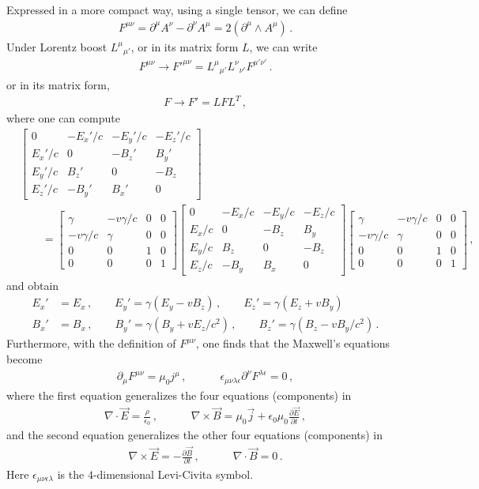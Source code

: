 \documentclass[11pt, onesided]{book}
\theoremstyle{break}
\theoremstyle{break}
\newcommand{\pd}{\partial}
\newcommand{\bmat}[1]{\begin{bmatrix} #1 \end{bmatrix}}
\begin{document}
Expressed in a more compact way, using a single tensor, we can define
\begin{align*}
F^{\mu\nu} = \pd^\mu A^\nu - \pd^\nu A^\mu = 2(\pd^\mu \wedge A^\mu)\,.
\end{align*}
Under Lorentz boost $L^\mu{}_{\mu'}$, or in its matrix form $L$, we can write
\begin{align*}
F^{\mu\nu}\to F'^{\mu\nu} = L^\mu{}_{\mu'}L^\nu{}_{\nu'}F^{\mu'\nu'}\,.
\end{align*}
or in its matrix form, 
\begin{align*}
F \to F' = LFL^T\,,
\end{align*}
where one can compute
\begin{align*}
&\bmat{0 & -E_x'/c & -E_y'/c & -E_z'/c \\
E_x'/c & 0 & -B_z' & B_y'\\
E_y'/c & B_z' & 0 & -B_z\\
E_z'/c & -B_y' & B_x' & 0}
 \\
 &{}\qquad = \bmat{\gamma & -v\gamma/c & 0 & 0\\
 -v\gamma/c & \gamma & 0 & 0\\
 0 & 0 & 1 & 0\\
 0 & 0 & 0 & 1}
 \bmat{0 & -E_x/c & -E_y /c & -E_z /c \\
E_x/c & 0 & -B_z & B_y\\
E_y/c & B_z & 0 & -B_z\\
E_z/c & -B_y & B_x & 0}
\bmat{\gamma & -v\gamma/c & 0 & 0\\
 -v\gamma/c & \gamma & 0 & 0\\
 0 & 0 & 1 & 0\\
 0 & 0 & 0 & 1}\,,
\end{align*}
and obtain
\begin{align*}
E_x' &= E_x\,,\qquad
E_y' = \gamma(E_y  -vB_z)\,,\qquad
E_z' = \gamma(E_z + vB_y)\\
B_x' &= B_x\,,\qquad
B_y' = \gamma(B_y+ vE_z/c^2)\,,\qquad
B_z' = \gamma(B_z-vB_y/c^2)\,.
\end{align*}
Furthermore, with the definition of $F^{\mu\nu}$, one finds that the Maxwell's equations become
\begin{align*}
\pd_\mu F^{\mu\nu} = \mu_0 j^\mu\,,\qquad\quad
\epsilon_{\mu\nu \lambda\epsilon}\pd^\nu F^{\lambda \epsilon} = 0\,,
\end{align*}
where the first equation generalizes the four equations (components) in 
\begin{align*}
\nabla \cdot \vec{E} = \frac{\rho }{\epsilon_0}\,,\qquad\quad
\nabla \times \vec{B} = \mu_0 \vec{j} + \epsilon_0 \mu_0 \frac{\pd \vec{E}}{\pd t}\,,
\end{align*}
and the second equation generalizes the other four equations (components) in
\begin{align*}
\nabla \times \vec{E} = -\frac{\pd \vec{B}}{\pd t}\,,\qquad\quad
\nabla \cdot \vec{B} = 0\,.
\end{align*}
Here $\epsilon_{\mu\nu\epsilon\lambda}$ is the $4$-dimensional Levi-Civita symbol.\\
\end{document}
